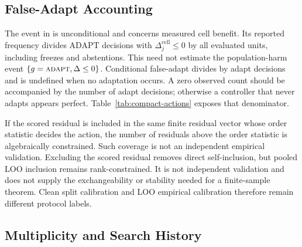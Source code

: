 \begin{table}[t]
\centering
\scriptsize
    \caption{Retrospective interval inclusion and decision diagnostics by corruption family under Protocol~B 5-fold outcome-disjoint cross-fitting (matching Table~\ref{tab:compact-actions} and Table~\ref{tab:cifar10c-decision-rules}; 2,160 CIFAR-10-C evaluations across 6 families). Width is full interval width, $2\varepsilon$. Marginal errors ($\mathrm{FA}_u$, $\mathrm{FF}_u$) divide by all $N=2{,}160$ cells; conditional errors ($\mathrm{FA}_c$, $\mathrm{FF}_c$) divide by the respective action count (ADAPT or FREEZE). These diagnostics report observed cell-level inclusion under cross-fitting; they do not establish group-conditional guarantees or transfer to unobserved corruption families.}
\label{tab:interval-groups}
\resizebox{\textwidth}{!}{}
\end{table}

\subsection{False-Adapt Accounting}

The event in  is unconditional and concerns measured cell benefit.
Its reported frequency divides ADAPT decisions with $\Delta_j^{\mathrm{cell}}\le0$ by all
evaluated units, including freezes and abstentions. This need not estimate the population-harm
event $\{g=\textnormal{\textsc{adapt}},\Delta\le0\}$. Conditional false-adapt
divides by adapt decisions and is undefined when no adaptation occurs. A zero observed count should
be accompanied by the number of adapt decisions; otherwise a controller that never adapts appears
perfect. Table~\ref{tab:compact-actions} exposes that denominator.

If the scored residual is included in the same finite residual vector whose order statistic decides
the action, the number of residuals above the order statistic is algebraically constrained. Such
coverage is not an independent empirical validation. Excluding the scored residual removes direct
self-inclusion, but pooled LOO inclusion remains rank-constrained. It is not independent validation
and does not supply the exchangeability or stability needed for a finite-sample theorem. Clean
split calibration and LOO empirical calibration therefore remain different protocol labels.

\subsection{Multiplicity and Search History}

